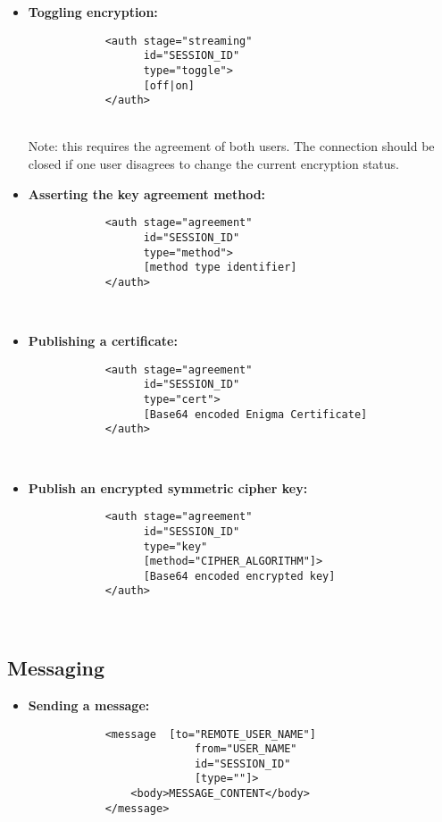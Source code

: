 \begin{itemize}
	\item \textbf{Toggling encryption:}
		\begin{verbatim}
			<auth stage="streaming"
			      id="SESSION_ID"
			      type="toggle">
			      [off|on]
			</auth>
		\end{verbatim} \\
		Note: this requires the agreement of both users. The connection should be closed if one user disagrees to change the current encryption status.
\end{itemize}

\begin{itemize}
	\item \textbf{Asserting the key agreement method:}
		\begin{verbatim}
			<auth stage="agreement"
			      id="SESSION_ID"
			      type="method">
			      [method type identifier]
			</auth>
		\end{verbatim} \\
\end{itemize}

\begin{itemize}
	\item \textbf{Publishing a certificate:}
		\begin{verbatim}
			<auth stage="agreement"
			      id="SESSION_ID"
			      type="cert">
			      [Base64 encoded Enigma Certificate]
			</auth>
		\end{verbatim} \\
\end{itemize}

\begin{itemize}
	\item \textbf{Publish an encrypted symmetric cipher key:}
		\begin{verbatim}
			<auth stage="agreement"
			      id="SESSION_ID"
			      type="key"
			      [method="CIPHER_ALGORITHM"]>
			      [Base64 encoded encrypted key]
			</auth>
		\end{verbatim} \\
\end{itemize}

\subsection{Messaging}

\begin{itemize}
	\item \textbf{Sending a message:}
		\begin{verbatim}
			<message  [to="REMOTE_USER_NAME"]
				          from="USER_NAME"
				          id="SESSION_ID"
				          [type=""]>
			    <body>MESSAGE_CONTENT</body>
			</message>
		\end{verbatim}
\end{itemize}


